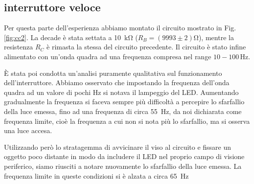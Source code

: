 \subsection{interruttore veloce}
Per questa parte dell'esperienza abbiamo montato il circuito mostrato in Fig. \ref{fig:cc2}.
La decade è stata settata a \SI{10}{\kilo\ohm} ($R_B = (9993 \pm 2)\si{\ohm}$), mentre la resistenza $R_C$ è rimasta la stessa del circuito precedente.
Il circuito è stato infine alimentato con un'onda quadra ad una frequenza compresa nel range $10-100\,\si{\hertz}$. %

È stata poi condotta un'analisi puramente qualitativa sul funzionamento dell'interruttore. Abbiamo osservato che impostando la frequenza dell'onda quadra ad un valore di pochi \si{\hertz} si notava il lampeggio del LED. Aumentando gradualmente la frequenza si faceva sempre più difficoltà a percepire lo sfarfallio della luce emessa, fino ad una frequenza di circa \SI{55}{\hertz}, da noi dichiarata come frequenza limite, cioè la frequenza a cui non si nota più lo sfarfallio, ma si osserva una luce accesa.

Utilizzando però lo stratagemma di avvicinare il viso al circuito e fissare un oggetto poco distante in modo da includere il LED nel proprio campo di visione periferico, siamo riusciti a notare nuovamente lo sfarfallio della luce emessa. La frequenza limite in queste condizioni si è alzata a circa \SI{65}{\hertz}